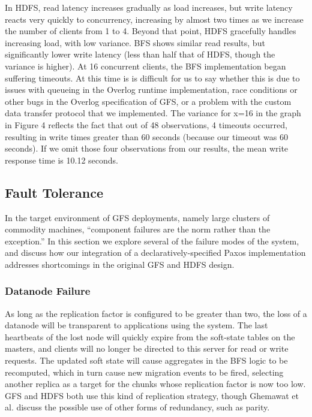 \documentclass{article}
\begin{document}
In HDFS, read latency increases gradually as load increases, but write
latency reacts very quickly to concurrency, increasing by almost two
times as we increase the number of clients from 1 to 4.  Beyond that
point, HDFS gracefully handles increasing load, with low variance.
BFS shows similar read results, but significantly lower write latency
(less than half that of HDFS, though the variance is higher).  At 16
concurrent clients, the BFS implementation began suffering timeouts.
At this time is is difficult for us to say whether this is due to
issues with queueing in the Overlog runtime implementation, race
conditions or other bugs in the Overlog specification of GFS, or a
problem with the custom data transfer protocol that we implemented.
The variance for x=16 in the graph in Figure 4 reflects the fact that
out of 48 observations, 4 timeouts occurred, resulting in write times
greater than 60 seconds (because our timeout was 60 seconds).  If we
omit those four observations from our results, the mean write response
time is 10.12 seconds.

\subsection{Fault Tolerance}
In the target environment of GFS deployments, namely large clusters of
commodity machines, ``component failures are the norm rather than the
exception.''  In this section we explore several of the failure modes
of the system, and discuss how our integration of a
declaratively-specified Paxos implementation addresses shortcomings in
the original GFS and HDFS design.

\subsubsection{Datanode Failure}
As long as the replication factor is configured to be greater than
two, the loss of a datanode will be transparent to applications using
the system.  The last heartbeats of the lost node will quickly expire
from the soft-state tables on the masters, and clients will no longer
be directed to this server for read or write requests.  The updated
soft state will cause aggregates in the BFS logic to be recomputed,
which in turn cause new migration events to be fired, selecting
another replica as a target for the chunks whose replication factor is
now too low.  GFS and HDFS both use this kind of replication strategy,
though Ghemawat et al. discuss the possible use of other forms of
redundancy, such as parity.
\end{document}
